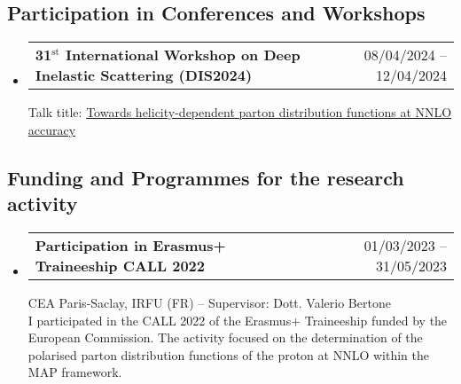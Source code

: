 \documentclass[10pt,a4paper]{article}
\makeatletter
\newcommand{\headerrow}[2]
{\begin{tabular*}{\linewidth}{l@{\extracolsep{\fill}}r}
	#1 &
	#2 \\
\end{tabular*}}
\makeatother
\begin{document}
\subsection*{Participation in Conferences and Workshops}
\begin{itemize}[leftmargin=1em]
    \item[]
    \headerrow
      {\textbf{31$^{\textrm{st}}$ International Workshop on Deep Inelastic Scattering (DIS2024)}}
      {08/04/2024 -- 12/04/2024}
      Talk title: \href{https://lpsc-indico.in2p3.fr/event/3268/contributions/7472/attachments/5307/7968/DIS_2024_MAP_4_3.pdf}{Towards helicity-dependent parton distribution functions at NNLO accuracy}
\end{itemize}

\subsection*{Funding and Programmes for the research activity}
\begin{itemize}[leftmargin=1em]
    \item[] 
      \headerrow
        {\textbf{Participation in Erasmus+ Traineeship CALL 2022}}
        {01/03/2023 -- 31/05/2023}
      CEA Paris-Saclay, IRFU (FR) -- Supervisor: Dott. Valerio Bertone \\[0.1em]
      I participated in the CALL 2022 of the Erasmus+ Traineeship funded by the European Commission. 
      The activity focused on the determination of the polarised parton distribution functions of the 
      proton at NNLO within the MAP framework.
\end{itemize}

\end{document}
